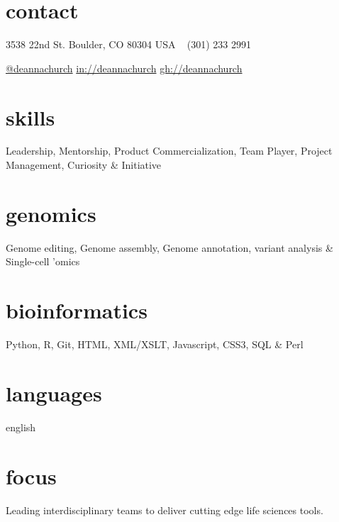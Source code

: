 \documentclass[]{dmc-cv} %
\begin{document}


\begin{aside} %
\section{contact}
3538 22nd St.
Boulder, CO 80304
USA
~
{\Large\textcolor{gray}{\Mobilefone}} \hfill (301) 233 2991
~

\tlogo \hfill \href{http://twitter.com/deannachurch}{@deannachurch}
\llogo \hfill \href{https://www.linkedin.com/in/deanna-church-a8749513/}{in://deannachurch}
\ghlogo \hfill \href{https://www.github.com/deannachurch}{gh://deannachurch}
~
\section{skills}
Leadership, Mentorship,
Product Commercialization,
Team Player,
Project Management,
Curiosity \& Initiative
\section{genomics}
Genome editing,
Genome assembly,
Genome annotation,
variant analysis \&
Single-cell 'omics
\section{bioinformatics}
Python, R, Git,
HTML, XML/XSLT, Javascript,
CSS3, SQL \& Perl


\section{languages}
english
\end{aside}

\section{focus}
Leading interdisciplinary teams to deliver cutting edge life sciences tools.
\end{document}
